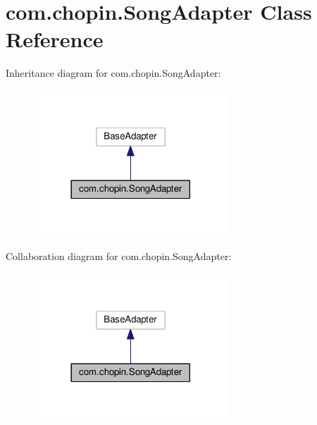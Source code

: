 \hypertarget{classcom_1_1chopin_1_1SongAdapter}{}\section{com.\+chopin.\+Song\+Adapter Class Reference}
\label{classcom_1_1chopin_1_1SongAdapter}


Inheritance diagram for com.\+chopin.\+Song\+Adapter\+:\nopagebreak
\begin{figure}[H]
\begin{center}
\leavevmode
\includegraphics[width=206pt]{classcom_1_1chopin_1_1SongAdapter__inherit__graph}
\end{center}
\end{figure}


Collaboration diagram for com.\+chopin.\+Song\+Adapter\+:\nopagebreak
\begin{figure}[H]
\begin{center}
\leavevmode
\includegraphics[width=206pt]{classcom_1_1chopin_1_1SongAdapter__coll__graph}
\end{center}
\end{figure}

